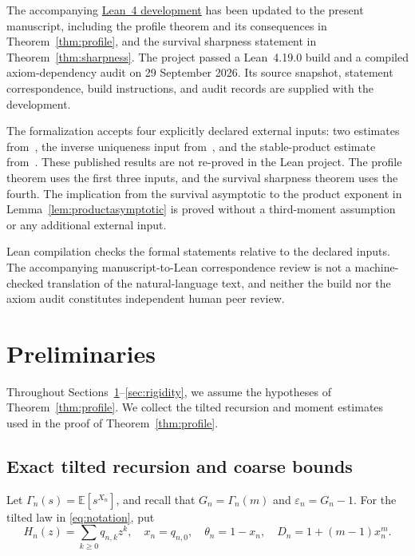 \documentclass[11pt,letterpaper,reqno]{amsart}
\numberwithin{equation}{section}
\theoremstyle{plain}
\theoremstyle{remark}
\newcommand{\E}{\mathbb E}\newcommand{\Pp}{\mathbb P}
\begin{document}
The accompanying \href{https://github.com/yszheng666/DR_Yaglom/tree/main/lean}{Lean~4 development}
has been updated to the present manuscript, including the profile theorem
and its consequences in Theorem~\ref{thm:profile}, and the survival
sharpness statement in Theorem~\ref{thm:sharpness}. The project passed a
Lean~4.19.0 build and a compiled axiom-dependency audit on 29 September 2026.
Its source snapshot, statement correspondence, build instructions, and
audit records are supplied with the development.

The formalization accepts four explicitly declared external inputs: two
estimates from~\cite{CDHLS}, the inverse uniqueness input from~\cite{Kotani},
and the stable-product estimate from~\cite{CS}. These published results
are not re-proved in the Lean project. The profile theorem uses the first
three inputs, and the survival sharpness theorem uses the fourth. The
implication from the survival asymptotic to the product exponent in
Lemma~\ref{lem:productasymptotic} is proved without a third-moment assumption
or any additional external input.

Lean compilation checks the formal statements relative to the declared
inputs. The accompanying manuscript-to-Lean correspondence review is not
a machine-checked translation of the natural-language text, and neither
the build nor the axiom audit constitutes independent human peer review.

\section{Preliminaries}\label{sec:prelim}
Throughout Sections~\ref{sec:prelim}--\ref{sec:rigidity}, we assume the hypotheses of Theorem~\ref{thm:profile}. We collect the tilted recursion and moment estimates used in the proof of Theorem~\ref{thm:profile}.

\subsection{Exact tilted recursion and coarse bounds}
Let $\Gamma_n(s)=\E[s^{X_n}]$, and recall that $G_n=\Gamma_n(m)$ and $\varepsilon_n=G_n-1$. For the tilted law in \eqref{eq:notation}, put
\[
 H_n(z)=\sum_{k\ge0}q_{n,k}z^k,\quad x_n=q_{n,0},\quad
 \theta_n=1-x_n,\quad D_n=1+(m-1)x_n^m.
\]
\end{document}
